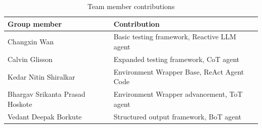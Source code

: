 
\begin{table}[htbp]
\centering
\caption{Team member contributions}
\begin{tabular}{ll}
\toprule
Group member & Contribution \\
\midrule
Changxin Wan & Basic testing framework, Reactive LLM agent \\
Calvin Glisson & Expanded testing framework, CoT agent \\
Kedar Nitin Shiralkar & Environment Wrapper Base, ReAct Agent Code \\
Bhargav Srikanta Prasad Hoskote & Environment Wrapper advancement, ToT agent \\
Vedant Deepak Borkute & Structured output framework, BoT agent\\
\bottomrule
\end{tabular}
\end{table}